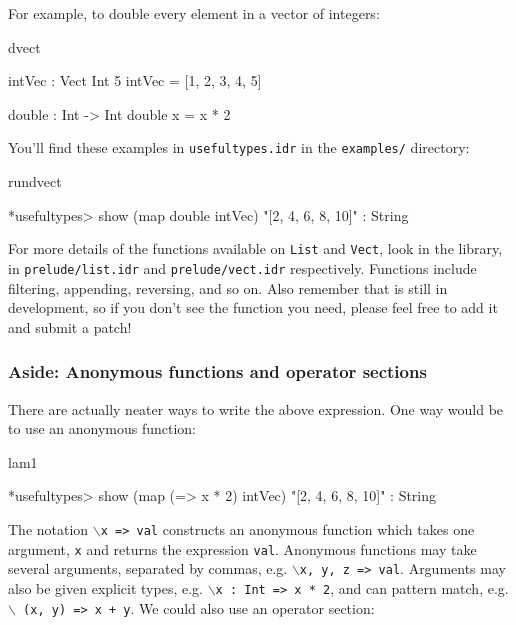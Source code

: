 \noindent
For example, to double every element in a vector of integers:

\begin{SaveVerbatim}{dvect}

intVec : Vect Int 5
intVec = [1, 2, 3, 4, 5]

double : Int -> Int
double x = x * 2

\end{SaveVerbatim}

\noindent
You'll find these examples in \texttt{usefultypes.idr} in the \texttt{examples/} directory:

\begin{SaveVerbatim}{rundvect}

*usefultypes> show (map double intVec) 
"[2, 4, 6, 8, 10]" : String

\end{SaveVerbatim}

\noindent
For more details of the functions available on \texttt{List} and \texttt{Vect},
look in the library, in \texttt{prelude/list.idr} and \texttt{prelude/vect.idr} respectively.
Functions include filtering, appending, reversing, and so on. Also remember
that \Idris{} is still in development, so if you don't see the function you
need, please feel free to add it and submit a patch!

\subsubsection*{Aside: Anonymous functions and operator sections}

There are actually neater ways to write the above expression. One way would be
to use an anonymous function:

\begin{SaveVerbatim}{lam1}

*usefultypes> show (map (\x => x * 2) intVec)
"[2, 4, 6, 8, 10]" : String

\end{SaveVerbatim}

\noindent
The notation \texttt{$\backslash$x => val} constructs an anonymous function
which takes one argument, \texttt{x} and returns the expression \texttt{val}.
Anonymous functions may take several arguments, separated by commas, e.g.
\texttt{$\backslash$x, y, z => val}. Arguments may also be given explicit
types, e.g. \texttt{$\backslash$x : Int => x * 2}, and can pattern match,
e.g. \texttt{$\backslash$ (x, y) => x + y}.
We could also use an operator section:

